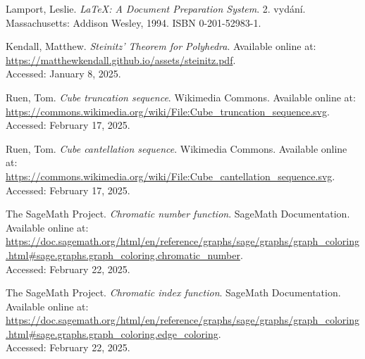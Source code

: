 
\def\bibname{Bibliography}
\begin{thebibliography}{99}
\addcontentsline{toc}{chapter}{\bibname}


  {\sc Lamport,} Leslie.
  \emph{\LaTeX: A Document Preparation System}.
  2. vydání.
  Massachusetts: Addison Wesley, 1994.
  ISBN 0-201-52983-1.

  {\sc Kendall,} Matthew.
  \emph{Steinitz’ Theorem for Polyhedra}. Available online at: \\ \url{https://matthewkendall.github.io/assets/steinitz.pdf}. \\
  Accessed: January 8, 2025.


  {\sc Ruen, Tom.} 
  \emph{Cube truncation sequence}. 
  Wikimedia Commons. Available online at: \\ \url{https://commons.wikimedia.org/wiki/File:Cube_truncation_sequence.svg}. \\
  Accessed: February 17, 2025.

  {\sc Ruen, Tom.} 
  \emph{Cube cantellation sequence}. 
  Wikimedia Commons. Available online at: \\ \url{https://commons.wikimedia.org/wiki/File:Cube_cantellation_sequence.svg}. \\
  Accessed: February 17, 2025.


  {\sc The SageMath Project.} 
  \emph{Chromatic number function}. 
  SageMath Documentation. Available online at: \\ 
  \url{https://doc.sagemath.org/html/en/reference/graphs/sage/graphs/graph_coloring.html#sage.graphs.graph_coloring.chromatic_number}. \\
  Accessed: February 22, 2025.

  {\sc The SageMath Project.} 
  \emph{Chromatic index function}. 
  SageMath Documentation. Available online at: \\ 
  \url{https://doc.sagemath.org/html/en/reference/graphs/sage/graphs/graph_coloring.html#sage.graphs.graph_coloring.edge_coloring}. \\
  Accessed: February 22, 2025.

\end{thebibliography}

